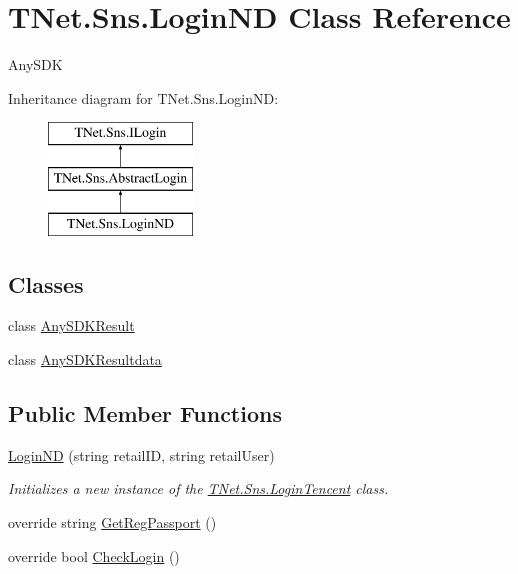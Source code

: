 \hypertarget{class_t_net_1_1_sns_1_1_login_n_d}{}\section{T\+Net.\+Sns.\+Login\+ND Class Reference}
\label{class_t_net_1_1_sns_1_1_login_n_d}


Any\+S\+DK  


Inheritance diagram for T\+Net.\+Sns.\+Login\+ND\+:\begin{figure}[H]
\begin{center}
\leavevmode
\includegraphics[height=3.000000cm]{class_t_net_1_1_sns_1_1_login_n_d}
\end{center}
\end{figure}
\subsection*{Classes}
\begin{DoxyCompactItemize}
\item 
class \mbox{\hyperlink{class_t_net_1_1_sns_1_1_login_n_d_1_1_any_s_d_k_result}{Any\+S\+D\+K\+Result}}
\item 
class \mbox{\hyperlink{class_t_net_1_1_sns_1_1_login_n_d_1_1_any_s_d_k_resultdata}{Any\+S\+D\+K\+Resultdata}}
\end{DoxyCompactItemize}
\subsection*{Public Member Functions}
\begin{DoxyCompactItemize}
\item 
\mbox{\hyperlink{class_t_net_1_1_sns_1_1_login_n_d_ae64fb6b6a873ec89b03d2e0e98bf1527}{Login\+ND}} (string retail\+ID, string retail\+User)
\begin{DoxyCompactList}\small\item\em Initializes a new instance of the \mbox{\hyperlink{class_t_net_1_1_sns_1_1_login_tencent}{T\+Net.\+Sns.\+Login\+Tencent}} class. \end{DoxyCompactList}\item 
override string \mbox{\hyperlink{class_t_net_1_1_sns_1_1_login_n_d_a3f84b2292edbc7310abbe64f757f37db}{Get\+Reg\+Passport}} ()
\item 
override bool \mbox{\hyperlink{class_t_net_1_1_sns_1_1_login_n_d_a2a3876bdd12ed6e5cc2bd6a653c2d2d0}{Check\+Login}} ()
\end{DoxyCompactItemize}

